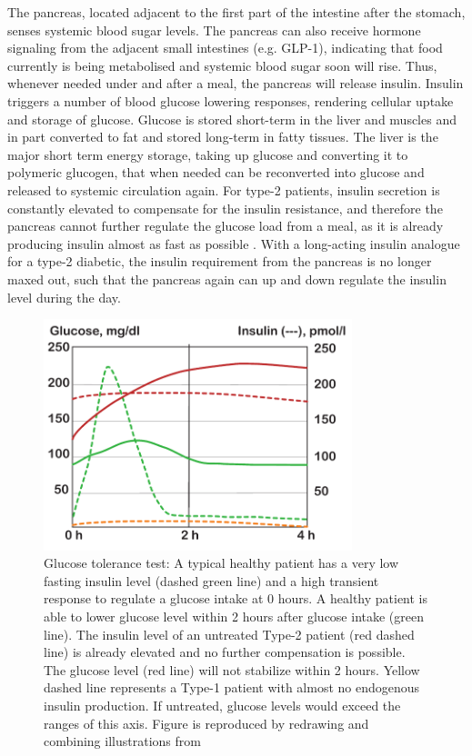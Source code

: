 The pancreas, located adjacent to the first part of the intestine after the stomach, senses systemic blood sugar levels. The pancreas can also receive hormone signaling from the adjacent small intestines (e.g. GLP-1), indicating that food currently is being metabolised and systemic blood sugar soon will rise. Thus, whenever needed under and after a meal, the pancreas will release insulin. Insulin triggers a number of blood glucose lowering responses, rendering cellular uptake and storage of glucose. Glucose is stored short-term in the liver and muscles and in part converted to fat and stored long-term in fatty tissues. The liver is the major short term energy storage, taking up glucose and converting it to polymeric glucogen, that when needed can be reconverted into glucose and released to systemic circulation again. For type-2 patients, insulin secretion is constantly elevated to compensate for the insulin resistance, and therefore the pancreas cannot further regulate the glucose load from a meal, as it is already producing insulin almost as fast as possible \cite{silverthorn2010human}. With a long-acting insulin analogue for a type-2 diabetic, the insulin requirement from the pancreas is no longer maxed out, such that the pancreas again can up and down regulate the insulin level during the day.

\begin{figure}[!htpb]
\includegraphics[width=0.8\textwidth,height=0.8\textheight,keepaspectratio]{graphics/glucoseTolerance.pdf}
\caption{Glucose tolerance test: A typical healthy patient has a very low fasting insulin level (dashed green line) and a high transient response to regulate a glucose intake at 0 hours. A healthy patient is able to lower glucose level within 2 hours after glucose intake (green line). The insulin level of an untreated Type-2 patient (red dashed line) is already elevated and no further compensation is possible. The glucose level (red line) will not stabilize within 2 hours. Yellow dashed line represents a Type-1 patient with almost no endogenous insulin production. If untreated, glucose levels would exceed the ranges of this axis. Figure is reproduced by redrawing and combining illustrations from \cite{silverthorn2010human,caumo2004first}}
\label{glucoseTolerance}
\end{figure}

